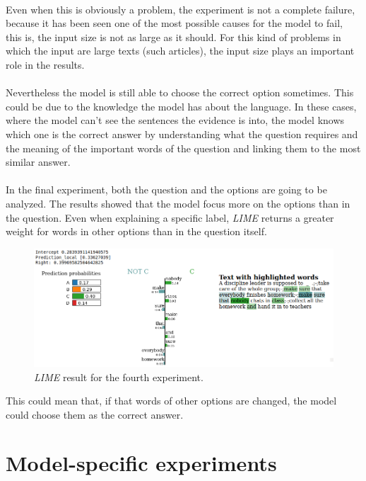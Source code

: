 \paragraph{}
Even when this is obviously a problem, the experiment is not a complete failure, because it has been seen one of the most possible causes for the model to fail, this is, the input size is not as large as it should. For this kind of problems in which the input are large texts (such articles), the input size plays an important role in the results.
\paragraph{}
Nevertheless the model is still able to choose the correct option sometimes. This could be due to the knowledge the model has about the language. In these cases, where the model can't see the sentences the evidence is into, the model knows which one is the correct answer by understanding what the question requires and the meaning of the important words of the question and linking them to the most similar answer.
\paragraph{}
In the final experiment, both the question and the options are going to be analyzed. The results showed that the model focus more on the options than in the question. Even when explaining a specific label, \emph{LIME} returns a greater weight for words in other options than in the question itself.
\begin{figure}[!h]
	\centering
	\includegraphics[scale=0.35]{images/lime-ex4-example1-real}
	\caption{\emph{LIME} result for the fourth experiment.}
	\label{fig:lime-result-4a}
\end{figure}
This could mean that, if that words of other options are changed, the model could choose them as the correct answer.

\section{Model-specific experiments}
\label{sec:ModelSpecificExperiments}
\noindent 
